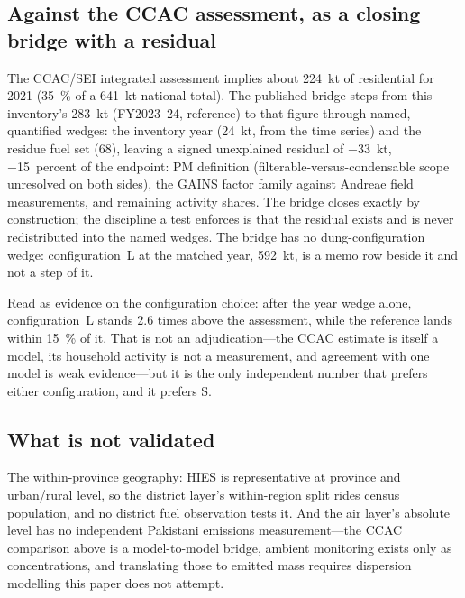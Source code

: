 \subsection{Against the CCAC assessment, as a closing bridge with a residual}

The CCAC/SEI integrated assessment \citep{ccacsei2023} implies about \SI{224}{\kilo\tonne}
of residential \PM{} for 2021 (\SI{35}{\percent} of a \SI{641}{\kilo\tonne} national
total). The published bridge steps from this inventory's \SI{283}{\kilo\tonne}
(FY2023--24, reference) to that figure through named, quantified wedges: the
inventory year (\SI{24}{\kilo\tonne}, from the time series) and the
residue fuel set (\SI{68}{}), leaving a signed unexplained residual of
\SI{-33}{\kilo\tonne}, \num{-15}~percent of the endpoint: PM definition
(filterable-versus-condensable scope unresolved on both sides), the GAINS factor family
against Andreae field measurements, and remaining activity shares. The bridge closes
exactly by construction; the discipline a test enforces is that the residual exists and
is never redistributed into the named wedges. The bridge has no dung-configuration wedge:
configuration~L at the matched year, \SI{592}{\kilo\tonne}, is a memo row beside it and
not a step of it.

Read as evidence on the configuration choice: after the year wedge alone, configuration~L
stands \num{2.6} times above the assessment, while the reference lands within
\SI{15}{\percent} of it. That is not an adjudication---the CCAC estimate is itself a
model, its household activity is not a measurement, and agreement with one model is weak
evidence---but it is the only independent number that prefers either configuration, and
it prefers S.

\subsection{What is not validated}

The within-province geography: HIES is representative at province and urban/rural level,
so the district layer's within-region split rides census population, and no district fuel
observation tests it. And the air layer's absolute level has no independent Pakistani
emissions measurement---the CCAC comparison above is a model-to-model bridge, ambient
monitoring exists only as concentrations, and translating those to emitted mass requires
dispersion modelling this paper does not attempt.
